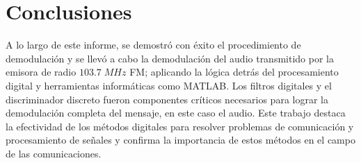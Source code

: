 \section*{Conclusiones}
A lo largo de este informe, se demostró con éxito el procedimiento de demodulación y se llevó a cabo la demodulación del audio transmitido por la emisora de radio $103.7\;MHz $ FM; aplicando la lógica detrás del procesamiento digital y herramientas informáticas como MATLAB. Los filtros digitales y el discriminador discreto fueron componentes críticos necesarios para lograr la demodulación completa del mensaje, en este caso el audio. Este trabajo destaca la efectividad de los métodos digitales para resolver problemas de comunicación y procesamiento de señales y confirma la importancia de estos métodos en el campo de las comunicaciones.

\hspace{1cm}